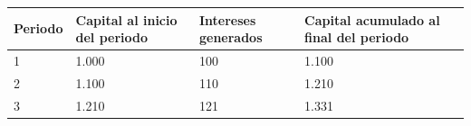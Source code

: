 \documentclass[
]{krantz}
\begin{document}
\begin{longtable}[]{@{}llll@{}}
\toprule
\begin{minipage}[b]{0.19\columnwidth}\raggedright
Periodo\strut
\end{minipage} & \begin{minipage}[b]{0.19\columnwidth}\raggedright
Capital al inicio del periodo\strut
\end{minipage} & \begin{minipage}[b]{0.19\columnwidth}\raggedright
Intereses generados\strut
\end{minipage} & \begin{minipage}[b]{0.32\columnwidth}\raggedright
Capital acumulado al final del periodo\strut
\end{minipage}\tabularnewline
\midrule
\endhead
\begin{minipage}[t]{0.19\columnwidth}\raggedright
1\strut
\end{minipage} & \begin{minipage}[t]{0.19\columnwidth}\raggedright
1.000\strut
\end{minipage} & \begin{minipage}[t]{0.19\columnwidth}\raggedright
100\strut
\end{minipage} & \begin{minipage}[t]{0.32\columnwidth}\raggedright
1.100\strut
\end{minipage}\tabularnewline
\begin{minipage}[t]{0.19\columnwidth}\raggedright
2\strut
\end{minipage} & \begin{minipage}[t]{0.19\columnwidth}\raggedright
1.100\strut
\end{minipage} & \begin{minipage}[t]{0.19\columnwidth}\raggedright
110\strut
\end{minipage} & \begin{minipage}[t]{0.32\columnwidth}\raggedright
1.210\strut
\end{minipage}\tabularnewline
\begin{minipage}[t]{0.19\columnwidth}\raggedright
3\strut
\end{minipage} & \begin{minipage}[t]{0.19\columnwidth}\raggedright
1.210\strut
\end{minipage} & \begin{minipage}[t]{0.19\columnwidth}\raggedright
121\strut
\end{minipage} & \begin{minipage}[t]{0.32\columnwidth}\raggedright
1.331\strut
\end{minipage}\tabularnewline
\bottomrule
\end{longtable}
\end{document}
